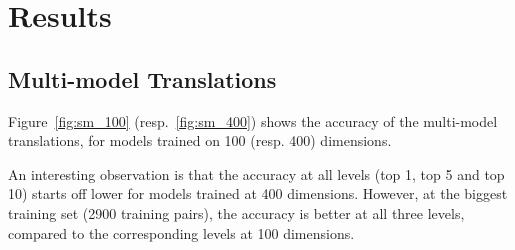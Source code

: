 \section{Results}
\label{sec:results}

\subsection{Multi-model Translations}
Figure~\ref{fig:sm_100} (resp.~\ref{fig:sm_400}) shows the accuracy of the multi-model translations, for models trained on 100 (resp. 400) dimensions.

An interesting observation is that the accuracy at all levels (top 1, top 5 and top 10) starts off lower for models trained at 400 dimensions. However, at the biggest training set (2900 training pairs), the accuracy is better at all three levels, compared to the corresponding levels at 100 dimensions.

